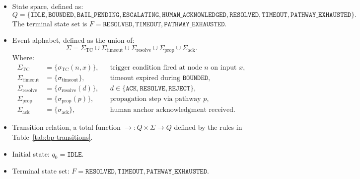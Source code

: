 \begin{itemize}\itemsep=0pt
\item[$Q$] State space, defined as:
\[
Q = \{
  \texttt{IDLE},
  \texttt{BOUNDED},
  \texttt{BAIL\_PENDING},
  \texttt{ESCALATING},
  \texttt{HUMAN\_ACKNOWLEDGED},
  \texttt{RESOLVED},
  \texttt{TIMEOUT},
  \texttt{PATHWAY\_EXHAUSTED}
\}.
\]
The terminal state set is $F = {\texttt{RESOLVED}, \texttt{TIMEOUT}, \texttt{PATHWAY\_EXHAUSTED}}$.

\item[$\Sigma$] Event alphabet, defined as the union of:
\[
\Sigma = \Sigma_{\text{TC}} \cup \Sigma_{\text{timeout}} \cup \Sigma_{\text{resolve}} \cup \Sigma_{\text{prop}} \cup \Sigma_{\text{ack}}.
\]
Where:
\begin{align*}
\Sigma_{\text{TC}} &= \{ \sigma_{\text{TC}}(n, x) \}, && \text{trigger condition fired at node } n \text{ on input } x,\\
\Sigma_{\text{timeout}} &= \{ \sigma_{\text{timeout}} \}, && \text{timeout expired during } \texttt{BOUNDED},\\
\Sigma_{\text{resolve}} &= \{ \sigma_{\text{resolve}}(d) \}, && d \in \{\texttt{ACK}, \texttt{RESOLVE}, \texttt{REJECT}\},\\
\Sigma_{\text{prop}} &= \{ \sigma_{\text{prop}}(p) \}, && \text{propagation step via pathway } p,\\
\Sigma_{\text{ack}} &= \{ \sigma_{\text{ack}} \}, && \text{human anchor acknowledgment received}.
\end{align*}

\item[$\rightarrow$] Transition relation, a total function $\rightarrow : Q \times \Sigma \rightarrow Q$ defined by the rules in Table~\ref{tab:bp-transitions}.

\item[$q_0$] Initial state: $q_0 = \texttt{IDLE}$.

\item[$F$] Terminal state set: $F = {\texttt{RESOLVED}, \texttt{TIMEOUT}, \texttt{PATHWAY\_EXHAUSTED}}$.
\end{itemize}

